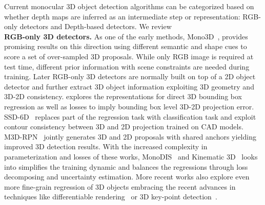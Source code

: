 Current monocular 3D object detection algorithms can be categorized based on whether depth maps are inferred as an intermediate step or representation: RGB-only detectors and Depth-based detectors.
We review 
\\
\noindent\textbf{RGB-only 3D detectors.}
As one of the early methods, Mono3D~\cite{chen2016monocular}, provides promising results on this direction using different semantic and shape cues to score a set of over-sampled 3D proposals. While only RGB image is required at test time, different prior information with scene constraints are needed during training.
Later RGB-only 3D detectors are normally built on top of a 2D object detector and further extract 3D object information exploiting 3D geometry and 3D-2D consistency. 
\cite{mousavian20173d} explores the representations for direct 3D bounding box regression as well as losses to imply bounding box level 3D-2D projection error.
SSD-6D~\cite{kehl2017ssd} replaces part of the regression task with classification task and exploit contour consistency between 3D and 2D projection trained on CAD models. 
M3D-RPN~\cite{brazil2019m3d} jointly generates 3D and 2D proposals with shared anchors yielding improved 3D detection results.
With the increased complexity in parameterization and losses of these works, MonoDIS~\cite{simonelli2019disentangling} and Kinematic 3D~\cite{brazil2020kinematic} looks into simplifies the training dynamic and balances the regressions through loss decomposing and uncertainty estimation. 
%
More recent works also explore even more fine-grain regression of 3D objects embracing the recent advances in techniques like differentiable rendering~\cite{beker2020monocular} or 3D key-point detection~\cite{liu2020smoke, barabanau2019monocular}.

